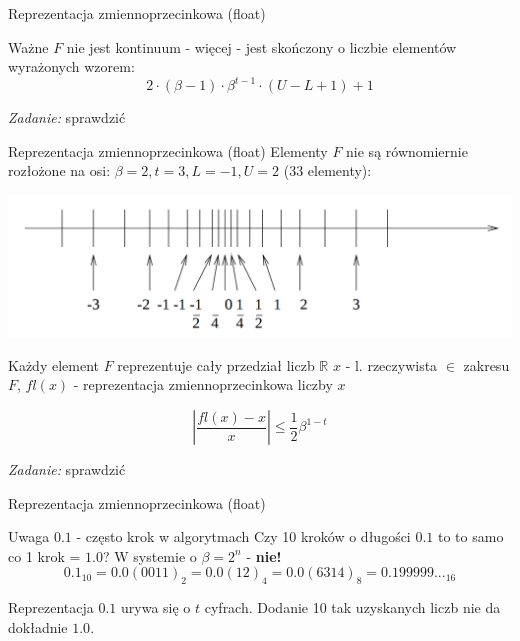 	\begin{frame}{Reprezentacja zmiennoprzecinkowa (float)}
    	\begin{block}{Ważne}
        $F$ nie jest kontinuum - więcej - jest skończony o liczbie elementów wyrażonych wzorem:
        \[
        2 \cdot \left(\beta - 1 \right) \cdot \beta^{t-1} \cdot \left( U - L + 1 \right) + 1
        \]
        \begin{flushright}
        	{\it Zadanie:} sprawdzić
        \end{flushright}
        \end{block}
 	\end{frame}
	\begin{frame}{Reprezentacja zmiennoprzecinkowa (float)}
    	Elementy $F$ nie są równomiernie rozłożone na osi:
        $\beta = 2, t = 3, L = -1, U = 2$ \hspace{5mm} (33 elementy):
        \begin{center}
        \includegraphics[width=0.8\linewidth]{img/2/2_1_axis}
        \end{center}
        
       	Każdy element $F$ reprezentuje cały przedział liczb $\mathbb{R}$\newline 
       	$x$ - l. rzeczywista $\in$ zakresu $F$,\newline
        $fl(x)$ - reprezentacja zmiennoprzecinkowa liczby $x$
        
        \[
        \left| \frac{fl(x) - x}{x} \right| \le \frac{1}{2} \beta^{1-t}
        \]
        
        \begin{flushright}
        	{\it Zadanie:} sprawdzić
        \end{flushright}
 	\end{frame}
	\begin{frame}{Reprezentacja zmiennoprzecinkowa (float)}
    	\begin{alertblock}{Uwaga}
    		$0.1$ - często krok w algorytmach\newline
            Czy 10 kroków o długości $0.1$ to to samo co 1 krok = $1.0$?\newline
            W systemie o $\beta = 2^n$ - {\bf nie!}
            \[
            0.1_{10} = 0.0(0011)_2 = 0.0(12)_4 = 0.0(6314)_8 = 0.199999..._{16}
            \]
            
            Reprezentacja $0.1$ urywa się o $t$ cyfrach. Dodanie 10 tak uzyskanych liczb nie da dokładnie $1.0$.
    	\end{alertblock}
 	\end{frame}
